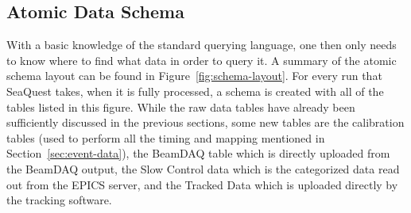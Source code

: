 \subsection{Atomic Data Schema}

With a basic knowledge of the standard querying language, one then only needs to know where to find what data in order to query it. A summary of the atomic schema layout can be found in Figure~\ref{fig:schema-layout}. For every run that SeaQuest takes, when it is fully processed, a schema is created with all of the tables listed in this figure. While the raw data tables have already been sufficiently discussed in the previous sections, some new tables are the calibration tables (used to perform all the timing and mapping mentioned in Section~\ref{sec:event-data}), the BeamDAQ table which is directly uploaded from the BeamDAQ output, the Slow Control data which is the categorized data read out from the EPICS server, and the Tracked Data which is uploaded directly by the tracking software.
